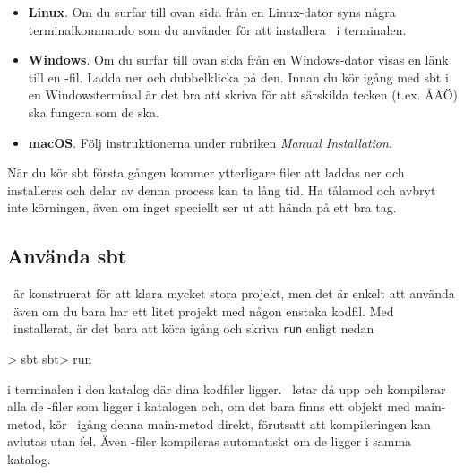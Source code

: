 \begin{itemize}

\item \textbf{Linux}. Om du surfar till ovan sida från en Linux-dator syns några terminalkommando som du använder för att installera \sbt\ i terminalen.

\item \textbf{Windows}. Om du surfar till ovan sida från en Windows-dator visas en länk till en -fil. Ladda ner och dubbelklicka på den. Innan du kör igång med sbt i en Windowsterminal är det bra att skriva  för att särskilda tecken (t.ex. ÅÄÖ) ska fungera som de ska.

\item \textbf{macOS}. Följ instruktionerna under rubriken \textit{Manual Installation}.

\end{itemize}

\noindent När du kör sbt första gången kommer ytterligare filer att laddas ner och installeras och delar av denna process kan ta lång tid. Ha tålamod och avbryt inte körningen, även om inget speciellt ser ut att hända på ett bra tag.

%
%


\subsection{Använda sbt}
\sbt\ är konstruerat för att klara mycket stora projekt, men det är enkelt att använda \sbt\ även om du bara har ett litet projekt med någon enstaka kodfil. Med \sbt\ installerat, är det bara att köra igång \sbt och skriva \texttt{run} enligt nedan
\begin{REPLnonum}
> sbt
sbt> run
\end{REPLnonum}
i terminalen i den katalog där dina kodfiler ligger. \sbt\ letar då upp och kompilerar alla de -filer som ligger i katalogen och, om det bara finns ett objekt med main-metod, kör \sbt\ igång denna main-metod direkt, förutsatt att kompileringen kan avlutas utan fel. Även -filer kompileras automatiskt om de ligger i samma katalog.

